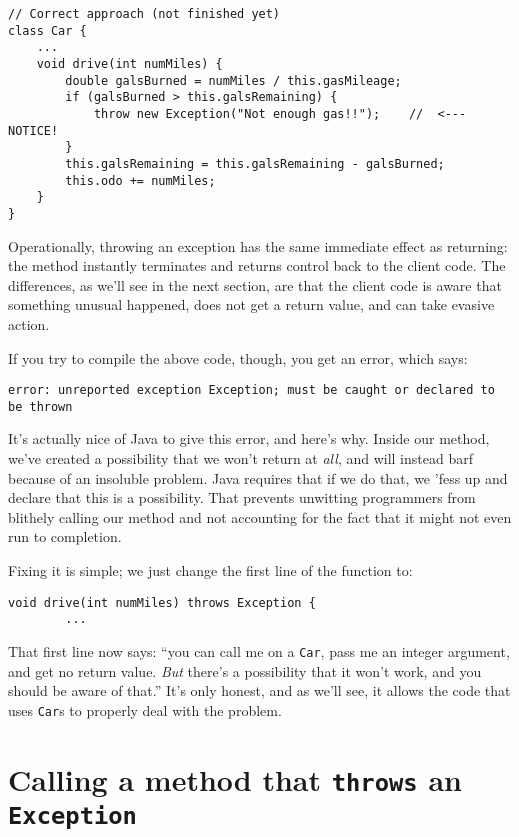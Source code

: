 \begin{Verbatim}[samepage=true,fontsize=\small,frame=single]
// Correct approach (not finished yet)
class Car {
    ...
    void drive(int numMiles) {
        double galsBurned = numMiles / this.gasMileage;
        if (galsBurned > this.galsRemaining) {
            throw new Exception("Not enough gas!!");    //  <---  NOTICE!
        }
        this.galsRemaining = this.galsRemaining - galsBurned;
        this.odo += numMiles;
    }
}
\end{Verbatim}

Operationally, throwing an exception has the same immediate effect as
returning: the method instantly terminates and returns control back to the
client code. The differences, as we'll see in the next section, are that the
client code is aware that something unusual happened, does not get a return
value, and can take evasive action.

If you try to compile the above code, though, you get an error, which says:

\begin{Verbatim}[samepage=true,fontsize=\footnotesize]
  error: unreported exception Exception; must be caught or declared to be thrown
\end{Verbatim}

It's actually nice of Java to give this error, and here's why. Inside our
method, we've created a possibility that we won't return at \textit{all}, and
will instead barf because of an insoluble problem. Java requires that if we do
that, we 'fess up and declare that this is a possibility. That prevents
unwitting programmers from blithely calling our method and not accounting for
the fact that it might not even run to completion.

Fixing it is simple; we just change the first line of the function to:

\begin{Verbatim}[samepage=true,fontsize=\footnotesize,frame=single]
    void drive(int numMiles) throws Exception {
        ...
\end{Verbatim}

That first line now says: ``you can call me on a \texttt{Car}, pass me an
integer argument, and get no return value. \textit{But} there's a possibility
that it won't work, and you should be aware of that.'' It's only honest, and
as we'll see, it allows the code that uses \texttt{Car}s to properly deal with
the problem.


\section{Calling a method that \texttt{throws} an \texttt{Exception}}

